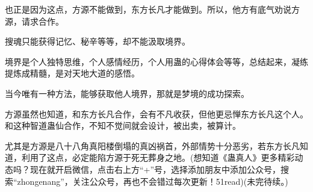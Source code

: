 \begin{this_body}
也正是因为这点，方源不能做到，东方长凡才能做到。所以，他方有底气劝说方源，请求合作。

搜魂只能获得记忆、秘辛等等，却不能汲取境界。

境界是个人独特思维，个人感情经历，个人用蛊的心得体会等等，总结起来，凝练提炼成精髓，是对天地大道的感悟。

当今唯有一种方法，能够获取他人境界，那就是梦境的成功探索。

方源虽然也知道，和东方长凡合作，会有不凡收获，但他更忌惮东方长凡这个人。和这种智道蛊仙合作，不知不觉间就会设计，被出卖，被算计。

尤其是方源是八十八角真阳楼倒塌的真凶祸首，外部情势十分恶劣，若东方长凡知道，利用了这点，必定能陷方源于死无葬身之地。(想知道《蛊真人》更多精彩动态吗？现在就开启微信，点击右上方“+”号，选择添加朋友中添加公众号，搜索“zhongenang”，关注公众号，再也不会错过每次更新！51read)(未完待续。)

\end{this_body}

